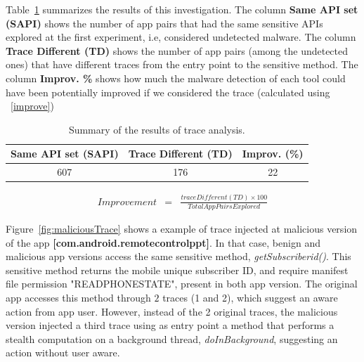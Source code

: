 Table~\ref{tab:pa} summarizes the results of this investigation. The column \textbf{Same API set (SAPI)} shows the number of app pairs that had the same sensitive APIs explored at the first experiment, i.e, considered undetected malware. The column \textbf{Trace Different (TD)} shows the number of app pairs (among the undetected ones) that have different traces from the entry point to the sensitive method. The column \textbf{Improv. \%} shows how much the malware detection of each tool could have been potentially improved if we considered the trace (calculated using ~\eqref{improve})

\begin{table}[ht!]
  \caption{Summary of the results of trace analysis. }
  \centering
  \begin{small}
 \begin{tabular}{ccc}
   \toprule
   Same API set (SAPI) & Trace Different (TD) & Improv. (\%) \\   \midrule
   607 & 176 & 22 \\
 \bottomrule
 \end{tabular}
 \end{small}
 \label{tab:pa}
\end{table}



\begin{eqnarray}
Improvement & = & \frac{trace Different (TD) \times 100}{Total App Pairs Explored} 
\label{improve}
\end{eqnarray}


Figure~\ref{fig:maliciousTrace} shows a example of trace injected at malicious version of the app \textbf{[com.android.remotecontrolppt]}. In that case, benign and malicious app versions access the same sensitive method, \textit{getSubscriberid()}. This sensitive method returns the mobile unique subscriber ID, and require manifest file permission "READ\underline{\space}PHONE\underline{\space}STATE", present in both app version. The original app accesses this method through $2$ traces (1 and 2), which suggest an aware action from app user. However, instead of the 2 original traces, the malicious version injected a third trace using as entry point a method that performs a stealth computation on a background thread, \textit{doInBackground}, suggesting an action without user aware.


